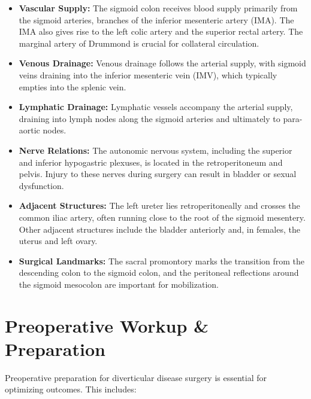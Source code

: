 \begin{itemize}
  \item \textbf{Vascular Supply:} The sigmoid colon receives blood supply primarily from the sigmoid arteries, branches of the inferior mesenteric artery (IMA). The IMA also gives rise to the left colic artery and the superior rectal artery. The marginal artery of Drummond is crucial for collateral circulation.
  
  \item \textbf{Venous Drainage:} Venous drainage follows the arterial supply, with sigmoid veins draining into the inferior mesenteric vein (IMV), which typically empties into the splenic vein.
  
  \item \textbf{Lymphatic Drainage:} Lymphatic vessels accompany the arterial supply, draining into lymph nodes along the sigmoid arteries and ultimately to para-aortic nodes.
  
  \item \textbf{Nerve Relations:} The autonomic nervous system, including the superior and inferior hypogastric plexuses, is located in the retroperitoneum and pelvis. Injury to these nerves during surgery can result in bladder or sexual dysfunction.
  
  \item \textbf{Adjacent Structures:} The left ureter lies retroperitoneally and crosses the common iliac artery, often running close to the root of the sigmoid mesentery. Other adjacent structures include the bladder anteriorly and, in females, the uterus and left ovary.
  
  \item \textbf{Surgical Landmarks:} The sacral promontory marks the transition from the descending colon to the sigmoid colon, and the peritoneal reflections around the sigmoid mesocolon are important for mobilization.
\end{itemize}

\section*{Preoperative Workup \& Preparation}
Preoperative preparation for diverticular disease surgery is essential for optimizing outcomes. This includes:

